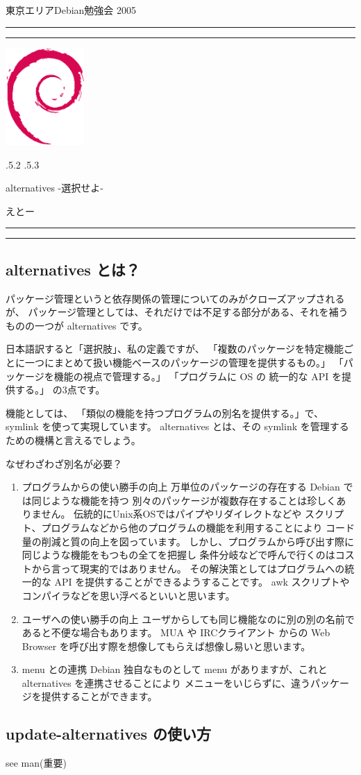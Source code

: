 \documentclass[mingoth]{jsarticle}
\makeatletter
\renewcommand{\section}{\@startsection{section}{1}{\z@}%
    {\Cvs \@plus.5\Cdp \@minus.2\Cdp}%
    {.5\Cvs \@plus.3\Cdp}%
    {\normalfont\Large\headfont\raggedright\centering}} %
\newcommand{\dancersection}[2]{%
\newpage
東京エリアDebian勉強会 2005
\hrule
\vspace{0.5mm}
\hrule
\hfill{}\includegraphics[width=3cm]{image200502/openlogo-nd.eps}\\
\vspace{-4cm}
\begin{center}
  \section{#1}
\end{center}
\hfill{}#2\hspace{3cm}\space\\
\hrule
\hrule
\vspace{1cm}
}
\makeatother
\begin{document}
\dancersection{alternatives -選択せよ-}{えとー}
\subsection{alternatives とは？}
     パッケージ管理というと依存関係の管理についてのみがクローズアップされるが、
   パッケージ管理としては、それだけでは不足する部分がある、それを補うものの一つが
   alternatives です。
  
     日本語訳すると「選択肢」、私の定義ですが、
   「複数のパッケージを特定機能ごとに一つにまとめて扱い機能ベースのパッケージの管理を提供するもの。」
   「パッケージを機能の視点で管理する。」
   「プログラムに OS の 統一的な API を提供する。」
    の3点です。

   機能としては、
     「類似の機能を持つプログラムの別名を提供する。」で、symlink を使って実現しています。
    alternatives とは、その symlink を管理するための機構と言えるでしょう。
 
   なぜわざわざ別名が必要？

\begin{enumerate}
 \item プログラムからの使い勝手の向上
     万単位のパッケージの存在する Debian では同じような機能を持つ
     別々のパッケージが複数存在することは珍しくありません。
     伝統的にUnix系OSではパイプやリダイレクトなどや
     スクリプト、プログラムなどから他のプログラムの機能を利用することにより
     コード量の削減と質の向上を図っています。
     しかし、プログラムから呼び出す際に同じような機能をもつもの全てを把握し
     条件分岐などで呼んで行くのはコストから言って現実的ではありません。
     その解決策としてはプログラムへの統一的な API を提供することができるようすることです。
     awk スクリプトやコンパイラなどを思い浮べるといいと思います。

 \item ユーザへの使い勝手の向上
     ユーザからしても同じ機能なのに別の別の名前であると不便な場合もあります。
     MUA や IRCクライアント からの Web Browser を呼び出す際を想像してもらえば想像し易いと思います。

 \item menu との連携
     Debian 独自なものとして menu がありますが、これと alternatives を連携させることにより
     メニューをいじらずに、違うパッケージを提供することができます。

\end{enumerate}

\subsection{update-alternatives の使い方}
  see man(重要)
\end{document}

